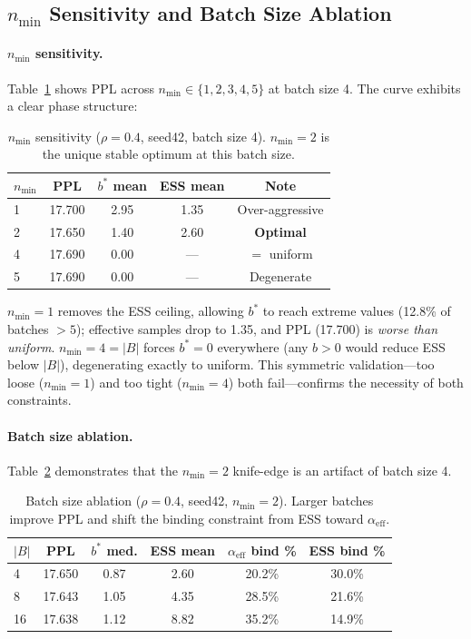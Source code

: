 \documentclass[11pt,a4paper]{article}
\newcommand{\bstar}{b^{*}}
\newcommand{\aeff}{\alpha_{\mathrm{eff}}}
\newcommand{\nmin}{n_{\min}}
\begin{document}
\subsection{$\nmin$ Sensitivity and Batch Size Ablation}
\label{sec:nmin_ablation}

\paragraph{$\nmin$ sensitivity.}
Table~\ref{tab:nmin} shows PPL across $\nmin \in \{1, 2, 3, 4, 5\}$ at batch size 4.
The curve exhibits a clear phase structure:

\begin{table}[t]
\centering
\small
\caption{$\nmin$ sensitivity ($\rho{=}0.4$, seed42, batch size 4). $\nmin = 2$ is the unique stable optimum at this batch size.}
\label{tab:nmin}
\begin{tabular}{lcccc}
\toprule
$\nmin$ & PPL & $\bstar$ mean & ESS mean & Note \\
\midrule
1 & 17.700 & 2.95 & 1.35 & Over-aggressive \\
2 & 17.650 & 1.40 & 2.60 & \textbf{Optimal} \\
4 & 17.690 & 0.00 & --- & $= $ uniform \\
5 & 17.690 & 0.00 & --- & Degenerate \\
\bottomrule
\end{tabular}
\end{table}

$\nmin = 1$ removes the ESS ceiling, allowing $\bstar$ to reach extreme values (12.8\% of batches $> 5$); effective samples drop to 1.35, and PPL (17.700) is \emph{worse than uniform}.
$\nmin = 4 = |B|$ forces $\bstar = 0$ everywhere (any $b > 0$ would reduce ESS below $|B|$), degenerating exactly to uniform.
This symmetric validation---too loose ($\nmin = 1$) and too tight ($\nmin = 4$) both fail---confirms the necessity of both constraints.

\paragraph{Batch size ablation.}
Table~\ref{tab:batchsize} demonstrates that the $\nmin = 2$ knife-edge is an artifact of batch size 4.

\begin{table}[t]
\centering
\small
\caption{Batch size ablation ($\rho{=}0.4$, seed42, $\nmin = 2$). Larger batches improve PPL and shift the binding constraint from ESS toward $\aeff$.}
\label{tab:batchsize}
\begin{tabular}{lccccc}
\toprule
$|B|$ & PPL & $\bstar$ med. & ESS mean & $\aeff$ bind \% & ESS bind \% \\
\midrule
4  & 17.650 & 0.87 & 2.60 & 20.2\% & 30.0\% \\
8  & 17.643 & 1.05 & 4.35 & 28.5\% & 21.6\% \\
16 & 17.638 & 1.12 & 8.82 & 35.2\% & 14.9\% \\
\bottomrule
\end{tabular}
\end{table}
\end{document}
